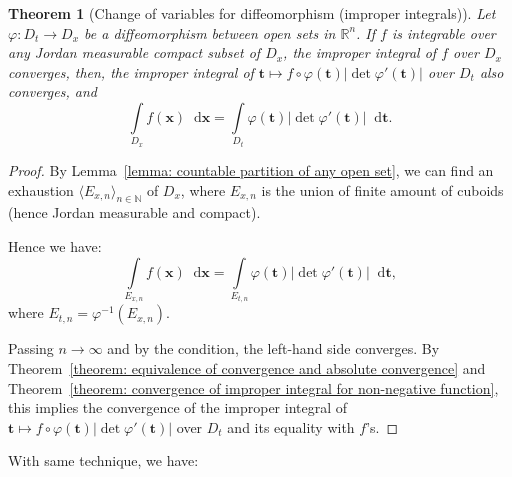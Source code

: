 \documentclass[openany]{book}
\theoremstyle{plain}
\newtheorem{theorem}{Theorem}[section] %
\theoremstyle{definition}
\newcommand{\dif}{\mathop{}\!\mathrm{d}} %
\newcommand*{\bv}{\boldsymbol} %
\begin{document}
\begin{theorem}[Change of variables for diffeomorphism (improper integrals)]
	\label{theorem: change of variables for diffeomorphism (improper integrals)}
	Let $\varphi \colon D_t \to D_x$ be a diffeomorphism between open sets in $\mathbb R^n$.
	If $f$ is integrable over any Jordan measurable compact subset of $D_x$, the improper integral of $f$ over $D_x$ converges, then, the improper integral of $\bv t \mapsto f \circ \varphi(\bv t) |\det \varphi'(\bv t)|$ over $D_t$ also converges, and
	\begin{equation*}
		\int\limits_{D_x} f(\bv x) \dif \bv x = \int\limits_{D_t} \varphi(\bv t) |\det \varphi'(\bv t)| \dif \bv t.
	\end{equation*}
\end{theorem}
\begin{proof}
	By Lemma~\ref{lemma: countable partition of any open set}, we can find an exhaustion $\langle E_{x, n}\rangle_{n \in \mathbb N}$ of $D_x$, where $E_{x, n}$ is the union of finite amount of cuboids (hence Jordan measurable and compact). 

	Hence we have:
	\begin{equation*}
		\int\limits_{E_{x, n}} f(\bv x) \dif \bv x = \int\limits_{E_{t, n}} \varphi(\bv t) |\det \varphi'(\bv t)| \dif \bv t,
	\end{equation*}
	where $E_{t, n} = \varphi^{-1}(E_{x, n})$.

	Passing $n \to \infty$ and by the condition, the left-hand side converges. 
	By Theorem~\ref{theorem: equivalence of convergence and absolute convergence} and Theorem~\ref{theorem: convergence of improper integral for non-negative function}, this implies the convergence of the improper integral of $\bv t \mapsto f \circ \varphi(\bv t) |\det \varphi'(\bv t)|$ over $D_t$ and its equality with $f$'s.
\end{proof}

With same technique, we have:
\end{document}
